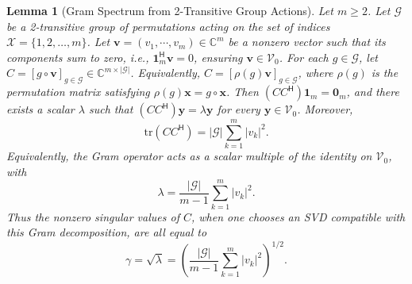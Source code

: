 \documentclass[11pt]{article}
\newtheorem{lemma}{Lemma}
\begin{document}
\begin{lemma}[Gram Spectrum from 2-Transitive Group Actions]
\label{lem:2_transitive_svd}
Let \(m \ge 2\). Let \(\mathcal G\) be a 2-transitive group of permutations acting on the set of indices \(\mathcal X = \{1,2,\dots,m\}\). Let \(\boldsymbol{v} = (v_1,\cdots,v_m) \in \mathbb{C}^m\) be a nonzero vector such that its components sum to zero, i.e., \(\boldsymbol{1}_m^{\mathsf H}\boldsymbol{v} = 0\), ensuring \(\boldsymbol{v} \in \mathcal V_0\). For each \(g \in \mathcal G\), let \(C = [g\circ\boldsymbol{v}]_{g \in \mathcal G} \in \mathbb{C}^{m \times |\mathcal G|}\). Equivalently, \(C=[\rho(g)\boldsymbol v]_{g\in\mathcal G}\), where \(\rho(g)\) is the permutation matrix satisfying \(\rho(g)\boldsymbol{x}=g\circ\boldsymbol{x}\). Then \((CC^{\mathsf H})\boldsymbol{1}_m=\boldsymbol{0}_m\), and there exists a scalar \(\lambda\) such that \((CC^{\mathsf H})\boldsymbol{y}=\lambda \boldsymbol{y}\) for every \(\boldsymbol{y}\in \mathcal V_0\). Moreover,
\[
\mathrm{tr}(CC^{\mathsf H})=|\mathcal G|\sum_{k=1}^m |v_k|^2.
\]
Equivalently, the Gram operator acts as a scalar multiple of the identity on \(\mathcal V_0\), with
\[
\lambda=\frac{|\mathcal G|}{m-1}\sum_{k=1}^m |v_k|^2.
\]
Thus the nonzero singular values of \(C\), when one chooses an SVD compatible with this Gram decomposition, are all equal to
\[
\gamma=\sqrt{\lambda}
=\left(\frac{|\mathcal G|}{m-1}\sum_{k=1}^m |v_k|^2\right)^{1/2}.
\]
\end{lemma}
\end{document}
